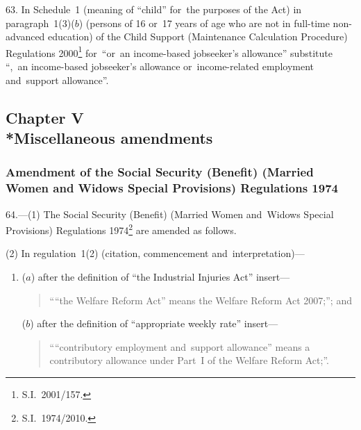 \documentclass[12pt,a4paper]{article}
\begin{document}
63.  In Schedule~1 (meaning of “child” for~the purposes of the Act) in paragraph~1(3)($b$)  (persons of 16 or~17 years of age who are not in full-time non-advanced education) of the Child Support (Maintenance Calculation Procedure) Regulations 2000\footnote{S.I.~2001/157.} for~“or~an income-based jobseeker’s allowance” substitute “,~an income-based jobseeker’s allowance or~income-related employment and~support allowance”.

\subsection[Chapter V --- Miscellaneous amendments]{Chapter V\\*Miscellaneous amendments}

\renewcommand\parthead{--- Part V Chapter V}

\subsubsection[64. Amendment of the Social Security (Benefit) (Married Women and~Widows Special Provisions) Regulations 1974]{Amendment of the Social Security (Benefit) (Married Women and Widows Special Provisions) Regulations 1974}

64.---(1)  The Social Security (Benefit) (Married Women and~Widows Special Provisions) Regulations 1974\footnote{S.I.~1974/2010.} are amended as follows.

(2) In regulation~1(2) (citation, commencement and~interpretation)—
\begin{enumerate}\item[]
($a$) after the definition of “the Industrial Injuries Act” insert—
\begin{quotation}
““the Welfare Reform Act” means the Welfare Reform Act 2007;”; and
\end{quotation}

($b$) after the definition of “appropriate weekly rate” insert—
\begin{quotation}
““contributory employment and~support allowance” means a contributory allowance under Part~I of the Welfare Reform Act;”.
\end{quotation}
\end{enumerate}
\end{document}
